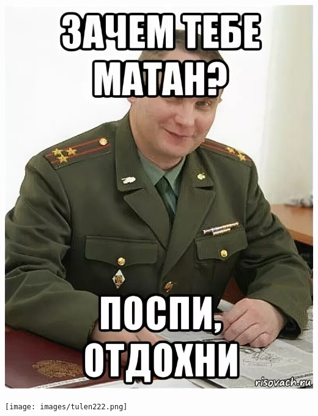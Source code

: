 \begin{titlepage}
\begin{minipage}{0.365\textwidth}
    \end{minipage}
    \vspace{10pt}
        \noindent 
    \begin{minipage}{0.3\textwidth}
    \includegraphics[width=\textwidth]{images/i (9).jpeg}
    \end{minipage}
    \begin{minipage}{0.3\textwidth}
    \texttt{[image: images/tulen222.png]}


\end{minipage}
\end{titlepage}
